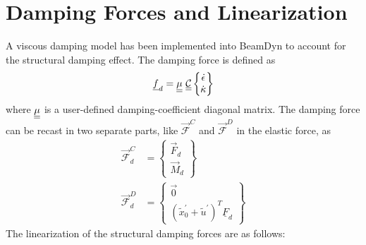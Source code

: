 \section{Damping Forces and Linearization}
A viscous damping model has been implemented into BeamDyn to account for the structural damping effect. 
The damping force is defined as 
\begin{equation}
   \label{Damping}
   \underline{f}_d = \underline{\underline{\mu}}~ \underline{\underline{\mathcal{C}}} \begin{Bmatrix}
   \dot{\epsilon} \\
   \dot{\kappa}
   \end{Bmatrix}
\end{equation}
where $ \underline{\underline{\mu}}$ is a user-defined damping-coefficient diagonal matrix. 
The damping force can be recast in two separate parts, like $\vec{\mathcal{F}}^C$ and $\vec{\mathcal{F}}^D$ in the elastic force, as
\begin{align}
   \label{DampingForce-1}
   \vec{\mathcal{F}}^C_d &= \begin{Bmatrix}
   \vec{F}_d \\
   \vec{M}_d
   \end{Bmatrix} \\
   \label{DampingForce-2}
   \vec{\mathcal{F}}^D_d &= \begin{Bmatrix}
    \vec{0} \\
    (\tilde{x}^\prime_0 + \tilde{u}^\prime)^T \underline{F}_d
    \end{Bmatrix}   
\end{align}
The linearization of the structural damping forces are as follows:
